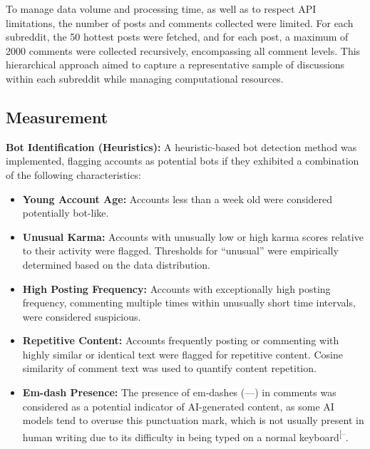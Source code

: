 \documentclass[
  12pt,
  letterpaper,
  DIV=11,
  numbers=noendperiod]{scrartcl}
\providecommand{\tightlist}{%
  \setlength{\itemsep}{0pt}\setlength{\parskip}{0pt}}\usepackage{longtable,booktabs,array}
\begin{document}
To manage data volume and processing time, as well as to respect API
limitations, the number of posts and comments collected were limited.
For each subreddit, the 50 hottest posts were fetched, and for each
post, a maximum of 2000 comments were collected recursively,
encompassing all comment levels. This hierarchical approach aimed to
capture a representative sample of discussions within each subreddit
while managing computational resources.

\subsection{Measurement}\label{measurement}

\textbf{Bot Identification (Heuristics):} A heuristic-based bot
detection method was implemented, flagging accounts as potential bots if
they exhibited a combination of the following characteristics:

\begin{itemize}
\tightlist
\item
  \textbf{Young Account Age:} Accounts less than a week old were
  considered potentially bot-like.
\item
  \textbf{Unusual Karma:} Accounts with unusually low or high karma
  scores relative to their activity were flagged. Thresholds for
  ``unusual'' were empirically determined based on the data
  distribution.
\item
  \textbf{High Posting Frequency:} Accounts with exceptionally high
  posting frequency, commenting multiple times within unusually short
  time intervals, were considered suspicious.
\item
  \textbf{Repetitive Content:} Accounts frequently posting or commenting
  with highly similar or identical text were flagged for repetitive
  content. Cosine similarity of comment text was used to quantify
  content repetition.
\item
  \textbf{Em-dash Presence:} The presence of em-dashes (---) in comments
  was considered as a potential indicator of AI-generated content, as
  some AI models tend to overuse this punctuation mark, which is not
  usually present in human writing due to its difficulty in being typed
  on a normal
  keyboard\textsuperscript{{[}--\citeproc{ref-nightwateremdash}{14}{]}}.
\end{itemize}
\end{document}
